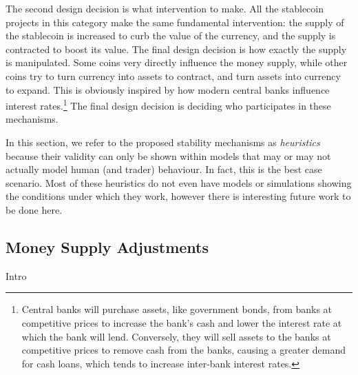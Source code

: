 The second design decision is what intervention to make. All the stablecoin projects in this category make the same fundamental intervention: the supply of the stablecoin is increased to curb the value of the currency, and the supply is contracted to boost its value. The final design decision is how exactly the supply is manipulated. Some coins very directly influence the money supply, while other coins try to turn currency into assets to contract, and turn assets into currency to expand. This is obviously inspired by how modern central banks influence interest rates.\footnote{Central banks will purchase assets, like government bonds, from banks at competitive prices to increase the bank's cash and lower the interest rate at which the bank will lend. Conversely, they will sell assets to the banks at competitive prices to remove cash from the banks, causing a greater demand for cash loans, which tends to increase inter-bank interest rates.} The final design decision is deciding who participates in these mechanisms. 

In this section, we refer to the proposed stability mechanisms as \textit{heuristics} because their validity can only be shown within models that may or may not actually model human (and trader) behaviour. In fact, this is the best case scenario. Most of these heuristics do not even have models or simulations showing the conditions under which they work, however there is interesting future work to be done here. 



\subsection{Money Supply Adjustments}
\label{sec:elastic}

Intro

